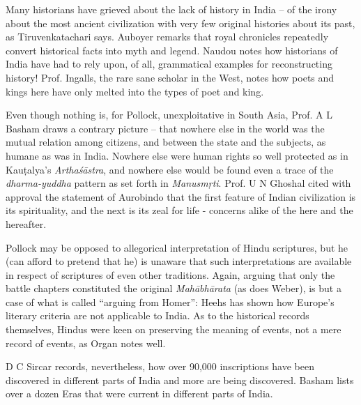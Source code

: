 \vskip 2pt

Many historians have grieved about the lack of history in India – of the irony about the most ancient civilization with very few original histories about its past, as Tiruvenkatachari says. Auboyer remarks that royal chronicles repeatedly convert historical facts into myth and legend. Naudou notes how historians of India have had to rely upon, of all, grammatical examples for reconstructing history! Prof. Ingalls, the rare sane scholar in the West, notes how poets and kings here have only melted into the types of poet and king.

\vskip 2pt

Even though nothing is, for Pollock, unexploitative in South Asia, Prof. A L Basham draws a contrary picture – that nowhere else in the world was the mutual relation among citizens, and between the state and the subjects, as humane as was in India. Nowhere else were human rights so well protected as in Kauṭalya’s \textit{Arthaśāstra}, and nowhere else would be found even a trace of the \textit{dharma-yuddha} pattern as set forth in \textit{Manusmṛti}. Prof. U N Ghoshal cited with approval the statement of Aurobindo that the first feature of Indian civilization is its spirituality, and the next is its zeal for life - concerns alike of the here and the hereafter.

\vskip 2pt

Pollock may be opposed to allegorical interpretation of Hindu scriptures, but he (can afford to pretend that he) is unaware that such interpretations are available in respect of scriptures of even other traditions. Again, arguing that only the battle chapters constituted the original \textit{Mahābhārata} (as does Weber), is but a case of what is called “arguing from Homer”: Heehs has shown how Europe’s literary criteria are not applicable to India. As to the historical records themselves, Hindus were keen on preserving the meaning of events, not a mere record of events, as Organ notes well.

\vskip 2pt

D C Sircar records, nevertheless, how over 90,000 inscriptions have been discovered in different parts of India and more are being discovered. Basham lists over a dozen Eras that were current in different parts of India.

